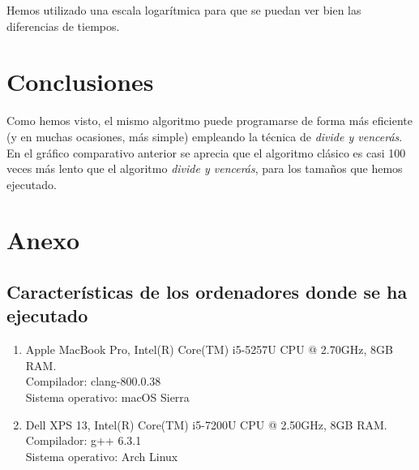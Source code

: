 \documentclass[11pt]{article}
\begin{document}
\begin{center}
	
\end{center}

Hemos utilizado una escala logarítmica para que se puedan ver bien las diferencias de tiempos.

\section*{Conclusiones}

Como hemos visto, el mismo algoritmo puede programarse de forma más eficiente (y en muchas ocasiones, más simple) empleando la técnica de \textit{divide y vencerás}. En el gráfico comparativo anterior se aprecia que el algoritmo clásico es casi 100 veces más lento que el algoritmo \textit{divide y vencerás}, para los tamaños que hemos ejecutado.

\newpage

\section*{Anexo}
\subsection*{Características de los ordenadores donde se ha ejecutado}

\vspace{0.5em}

\begin{enumerate}
\item Apple MacBook Pro, Intel(R) Core(TM) i5-5257U CPU @ 2.70GHz, 8GB RAM.\\  Compilador: clang-800.0.38 \\
  Sistema operativo: macOS Sierra
\item Dell XPS 13, Intel(R) Core(TM) i5-7200U CPU @ 2.50GHz, 8GB RAM.\\
  Compilador: g++ 6.3.1\\
  Sistema operativo: Arch Linux
\end{enumerate}
\end{document}
